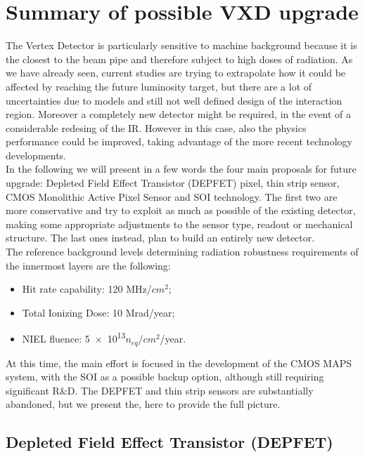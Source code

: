 \section{Summary of possible VXD upgrade}

The Vertex Detector is particularly sensitive to machine background because it is the closest to the beam pipe and therefore subject to high doses of radiation.
As we have already seen, current studies are trying to extrapolate how it could be affected by reaching the future luminosity target, but there are a lot of uncertainties due to models and still not well defined design of the interaction region. Moreover a completely new detector might be required, in the event of a considerable redesing of the IR. However in this case, also the physics performance could be improved, taking advantage of the more recent technology developments.\\

In the following we will present in a few words the four main proposals for future upgrade: Depleted Field Effect Transistor (DEPFET) pixel, thin strip sensor, CMOS Monolithic Active Pixel Sensor and SOI technology.
The first two are more conservative and try to exploit as much as possible of the existing detector, making some appropriate adjustments to the sensor type, readout or mechanical structure. The last ones instead, plan to build an entirely new detector.\\

The reference background levels determining radiation robustness requirements of the innermost layers are the following:

\begin{itemize}
\item Hit rate capability: 120 MHz/$cm^{2}$;
\item Total Ionizing Dose: 10 Mrad/year;
\item NIEL fluence: \num{5e13}$n_{eq}$/$cm^{2}$/year.
\end{itemize}

At this time, the main effort is focused in the development of the CMOS MAPS system, with the SOI as a possible backup option, although still requiring significant R\&D. The DEPFET and thin strip sensors are substantially abandoned, but we present the, here to provide the full picture.


\subsection{Depleted Field Effect Transistor (DEPFET)}


